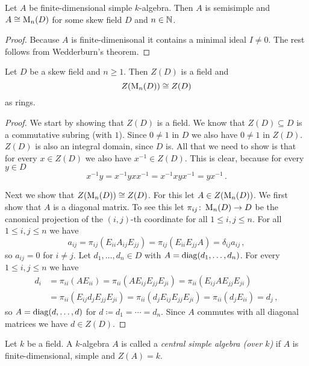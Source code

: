 \begin{corollary}
  Let $A$ be finite-dimensional simple $k$-algebra.
  Then $A$ is semisimple and $A \cong \operatorname{M}_n(D)$ for some skew field $D$ and $n \in \mathbb{N}$.
\end{corollary}
\begin{proof}
  Because $A$ is finite-dimenisonal it contains a minimal ideal $I \neq 0$.
  The rest follows from Wedderburn’s theorem.
\end{proof}


\begin{lemma}
  Let $D$ be a skew field and $n \geq 1$.
  Then $Z(D)$ is a field and
  \[
    Z(\operatorname{M}_n(D)) \cong Z(D)
  \]
  as rings.
\end{lemma}
\begin{proof}
  We start by showing that $Z(D)$ is a field.
  We know that $Z(D) \subseteq D$ is a commutative subring (with $1$).
  Since $0 \neq 1$ in $D$ we also have $0 \neq 1$ in $Z(D)$.
  $Z(D)$ is also an integral domain, since $D$ is.
  All that we need to show is that for every $x \in Z(D)$ we also have $x^{-1} \in Z(D)$.
  This is clear, because for every $y \in D$
  \[
      x^{-1} y
    = x^{-1} y x x^{-1}
    = x^{-1} x y x^{-1}
    = y x^{-1} \,.
  \]
  
  Next we show that $Z(\operatorname{M}_n(D)) \cong Z(D)$.
  For this let $A \in Z(\operatorname{M}_n(D))$.
  We first show that $A$ is a diagonal matrix.
  To see this let $\pi_{ij} \colon \operatorname{M}_n(D) \to D$ be the canonical projection of the $(i,j)$-th coordinate for all $1 \leq i,j \leq n$.
  For all $1 \leq i,j \leq n$ we have
  \[
      a_{ij}
    = \pi_{ij}(E_{ii} A_{ij} E_{jj})
    = \pi_{ij}(E_{ii} E_{jj} A)
    = \delta_{ij} a_{ij} \,,
  \]
  so $a_{ij} = 0$ for $i \neq j$.
  Let $d_1, \dotsc, d_n \in D$ with $A = \operatorname{diag}(d_1, \dotsc, d_n)$.
  For every $1 \leq i,j \leq n$ we have
  \begin{align*}
        d_i
    &=  \pi_{ii}(A E_{ii})
     =  \pi_{ii}(A E_{ij} E_{jj} E_{ji})
     =  \pi_{ii}(E_{ij} A E_{jj} E_{ji}) \\
    &=  \pi_{ii}(E_{ij} d_j E_{jj} E_{ji})
     =  \pi_{ii}(d_j E_{ij} E_{jj} E_{ji})
     =  \pi_{ii}(d_j E_{ii})
     =  d_j \,,
  \end{align*}
  so $A = \operatorname{diag}(d, \dotsc, d)$ for $d \coloneqq d_1 = \dotsb = d_n$.
  Since $A$ commutes with all diagonal matrices we have $d \in Z(D)$.
\end{proof}


\begin{definition}
  Let $k$ be a field.
  A $k$-algebra $A$ is called a \emph{central simple algebra (over $k$)} if $A$ is finite-dimensional, simple and $Z(A) = k$.
\end{definition}


